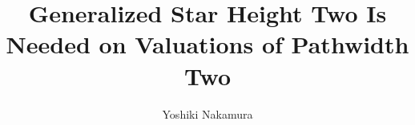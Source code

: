 \documentclass[a4paper,USenglish,cleveref,autoref,thm-restate]{lipics-v2021}
\title{Generalized Star Height Two Is Needed on Valuations of Pathwidth Two}
\author{Yoshiki Nakamura}{Chiba University, Japan}{nakamura.yoshiki.ny@gmail.com}{https://orcid.org/0000-0003-4106-0408}{}
\begin{document}
\maketitle

\begin{abstract}

\end{abstract}













\end{document}
